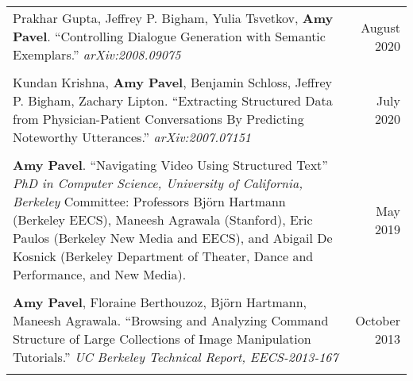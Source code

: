 \begin{longtable}{Xr}
	Prakhar Gupta, Jeffrey P. Bigham, Yulia Tsvetkov, \textbf{Amy Pavel}. ``Controlling Dialogue Generation with Semantic Exemplars.'' \textit{arXiv:2008.09075} & August 2020 \\
	\\

	Kundan Krishna, \textbf{Amy Pavel}, Benjamin Schloss, Jeffrey P. Bigham, Zachary Lipton. ``Extracting Structured Data from Physician-Patient Conversations By Predicting Noteworthy Utterances.'' \textit{arXiv:2007.07151} & July 2020 \\
	\\

	\textbf{Amy Pavel}. ``Navigating Video Using Structured Text'' \textit{PhD in Computer Science, University of California, Berkeley} Committee: Professors Björn Hartmann (Berkeley EECS), Maneesh Agrawala (Stanford), Eric Paulos (Berkeley New Media and EECS), and Abigail De Kosnick (Berkeley Department of Theater, Dance and Performance, and New Media). & May 2019 \\
	\\

	\textbf{Amy Pavel}, Floraine Berthouzoz, Björn Hartmann, Maneesh Agrawala. ``Browsing and Analyzing Command Structure of Large Collections of Image Manipulation Tutorials.'' \textit{UC Berkeley Technical Report, EECS-2013-167} & October 2013 \\
	\\

\end{longtable}